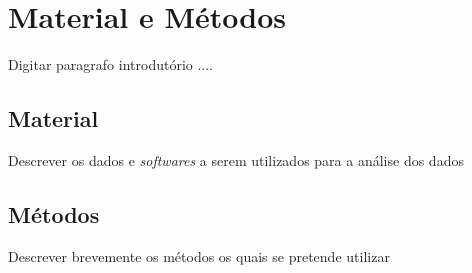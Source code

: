 \documentclass[
	12pt,				%
	openright,			%
	oneside,			%
	a4paper,			%
	brazil				%
	]{abntex2}
\begin{document}
\chapter{Material e Métodos}
\bigskip

Digitar paragrafo introdutório ....

\section{Material}

Descrever os dados e \textit{softwares} a serem utilizados para a análise dos dados

\section{Métodos}

Descrever brevemente os métodos os quais se pretende utilizar
\end{document}
